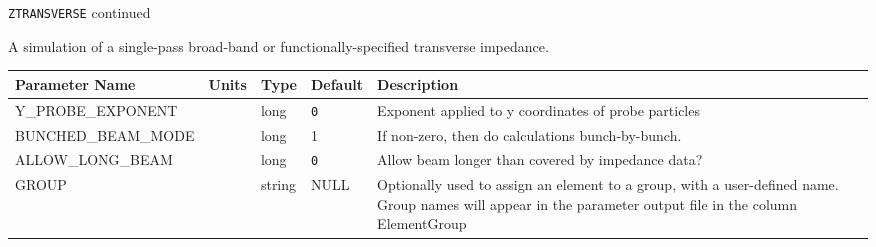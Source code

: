 \newpage
\begin{center}{\Large\verb|ZTRANSVERSE| continued}\end{center}
A simulation of a single-pass broad-band or functionally-specified transverse impedance.
\\
\begin{tabular}{|l|l|l|l|p{\descwidth}|} \hline
Parameter Name & Units & Type & Default & Description \\ \hline 
Y\_PROBE\_EXPONENT &  & long &  \verb|0| & Exponent applied to y coordinates of probe particles  \\ \hline 
BUNCHED\_BEAM\_MODE &  & long &   1               & If non-zero, then do calculations bunch-by-bunch.  \\ \hline 
ALLOW\_LONG\_BEAM &  & long &  \verb|0| & Allow beam longer than covered by impedance data?  \\ \hline 
GROUP &  & string & NULL & Optionally used to assign an element to a group, with a user-defined name.  Group names will appear in the parameter output file in the column ElementGroup  \\ \hline 
\end{tabular}

\vspace*{0.5in}

